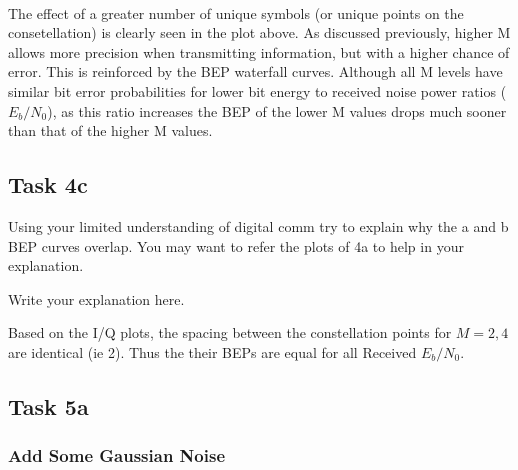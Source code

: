 \documentclass[11pt]{article}
\begin{document}
    \begin{center}
    \end{center}
    { \hspace*{\fill} \\}
    
    The effect of a greater number of unique symbols (or unique points on
the consetellation) is clearly seen in the plot above. As discussed
previously, higher M allows more precision when transmitting
information, but with a higher chance of error. This is reinforced by
the BEP waterfall curves. Although all M levels have similar bit error
probabilities for lower bit energy to received noise power ratios
(\(E_b/N_0\)), as this ratio increases the BEP of the lower M values
drops much sooner than that of the higher M values.

    \subsection{Task 4c}\label{task-4c}

Using your limited understanding of digital comm try to explain why the
a and b BEP curves overlap. You may want to refer the plots of 4a to
help in your explanation.

Write your explanation here.

Based on the I/Q plots, the spacing between the constellation points for
\(M = 2,4\) are identical (ie 2). Thus the their BEPs are equal for all
Received \(E_b/N_0\).

    \subsection{Task 5a}\label{task-5a}

    \subsubsection{Add Some Gaussian Noise}\label{add-some-gaussian-noise}
\end{document}

